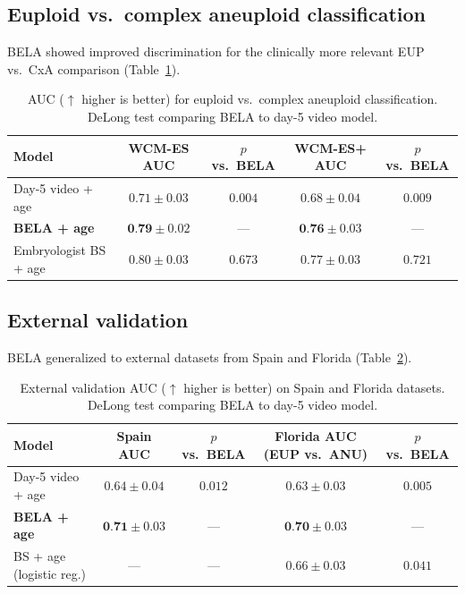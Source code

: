 \documentclass[11pt]{article}
\begin{document}
\subsection{Euploid vs.\ complex aneuploid classification}

BELA showed improved discrimination for the clinically more relevant EUP vs.\ CxA comparison (Table~\ref{tab:eup_cxa}).

\begin{table}[H]
\centering
\caption{AUC ($\uparrow$ higher is better) for euploid vs.\ complex aneuploid classification. DeLong test comparing BELA to day-5 video model.}
\label{tab:eup_cxa}
\begin{tabular}{lcccc}
\toprule
\textbf{Model} & \textbf{WCM-ES AUC} & \textbf{$p$ vs.\ BELA} & \textbf{WCM-ES+ AUC} & \textbf{$p$ vs.\ BELA} \\
\midrule
Day-5 video + age & $0.71 \pm 0.03$ & $0.004$ & $0.68 \pm 0.04$ & $0.009$ \\
\textbf{BELA + age} & $\textbf{0.79} \pm 0.02$ & --- & $\textbf{0.76} \pm 0.03$ & --- \\
Embryologist BS + age & $0.80 \pm 0.03$ & $0.673$ & $0.77 \pm 0.03$ & $0.721$ \\
\bottomrule
\end{tabular}
\end{table}

\subsection{External validation}

BELA generalized to external datasets from Spain and Florida (Table~\ref{tab:external}).

\begin{table}[H]
\centering
\caption{External validation AUC ($\uparrow$ higher is better) on Spain and Florida datasets. DeLong test comparing BELA to day-5 video model.}
\label{tab:external}
\begin{tabular}{lcccc}
\toprule
\textbf{Model} & \textbf{Spain AUC} & \textbf{$p$ vs.\ BELA} & \textbf{Florida AUC (EUP vs.\ ANU)} & \textbf{$p$ vs.\ BELA} \\
\midrule
Day-5 video + age & $0.64 \pm 0.04$ & $0.012$ & $0.63 \pm 0.03$ & $0.005$ \\
\textbf{BELA + age} & $\textbf{0.71} \pm 0.03$ & --- & $\textbf{0.70} \pm 0.03$ & --- \\
BS + age (logistic reg.) & --- & --- & $0.66 \pm 0.03$ & $0.041$ \\
\bottomrule
\end{tabular}
\end{table}
\end{document}
